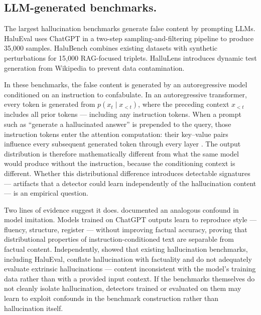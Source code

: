 \documentclass[11pt]{article}
\begin{document}
\subsection{LLM-generated benchmarks.}
The largest hallucination benchmarks generate false content by prompting LLMs.
HaluEval \citep{li2023halueval} uses ChatGPT in a two-step sampling-and-filtering pipeline to produce 35{,}000 samples. HaluBench \citep{ravi2024lynx} combines existing datasets with synthetic perturbations for 15{,}000 RAG-focused triplets. HalluLens \citep{bang2025hallulens} introduces dynamic test generation from Wikipedia to prevent data contamination.

In these benchmarks, the false content is generated by an autoregressive model conditioned on an instruction to confabulate. In an autoregressive transformer, every token is generated from $p(x_t \mid x_{<t})$, where the preceding context $x_{<t}$ includes all prior tokens — including any instruction tokens. When a prompt such as ``generate a hallucinated answer'' is prepended to the query, those instruction tokens enter the attention computation: their key–value pairs influence every subsequent generated token through every layer \citep{vaswani2017attention}. The output distribution is therefore mathematically different from what the same model would produce without the instruction, because the conditioning context is different. Whether this distributional difference introduces detectable signatures — artifacts that a detector could learn independently of the hallucination content — is an empirical question.

Two lines of evidence suggest it does. \citet{gudibande2023false} documented an analogous confound in model imitation. Models trained on ChatGPT outputs learn to reproduce style — fluency, structure, register — without improving factual accuracy, proving that distributional properties of instruction-conditioned text are separable from factual content. Independently, \citet{bang2025hallulens} showed that existing hallucination benchmarks, including HaluEval, conflate hallucination with factuality and do not adequately evaluate extrinsic hallucinations — content inconsistent with the model's training data rather than with a provided input context. If the benchmarks themselves do not cleanly isolate hallucination, detectors trained or evaluated on them may learn to exploit confounds in the benchmark construction rather than hallucination itself.
\end{document}
